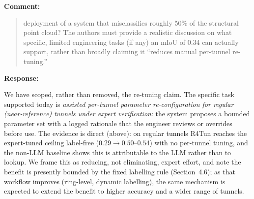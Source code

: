 \documentclass[11pt,a4paper]{article}
\newenvironment{commentblock}{%
  \par\smallskip\noindent\textbf{Comment:}\par
  \begin{quote}\itshape\color{black}
}{%
  \end{quote}\smallskip
}
\newenvironment{responseblock}{%
  \par\smallskip\noindent\textbf{Response:}\par
  \begingroup\color{responsegreen}
}{%
  \endgroup\smallskip
}
\begin{document}
\begin{commentblock}
deployment of a system that misclassifies roughly 50\% of the structural point cloud? The authors must provide a realistic discussion on what specific, limited engineering tasks (if any) an mIoU of 0.34 can actually support, rather than broadly claiming it ``reduces manual per-tunnel re-tuning.''
\end{commentblock}

\begin{responseblock}
We have scoped, rather than removed, the re-tuning claim. The specific task supported today is \emph{assisted per-tunnel parameter re-configuration for regular (near-reference) tunnels under expert verification}: the system proposes a bounded parameter set with a logged rationale that the engineer reviews or overrides before use. The evidence is direct (above): on regular tunnels R4Tun reaches the expert-tuned ceiling label-free ($0.29 \rightarrow 0.50$--$0.54$) with no per-tunnel tuning, and the non-LLM baseline shows this is attributable to the LLM rather than to lookup. We frame this as reducing, not eliminating, expert effort, and note the benefit is presently bounded by the fixed labelling rule (Section~4.6); as that workflow improves (ring-level, dynamic labelling), the same mechanism is expected to extend the benefit to higher accuracy and a wider range of tunnels.
\end{responseblock}
\end{document}
